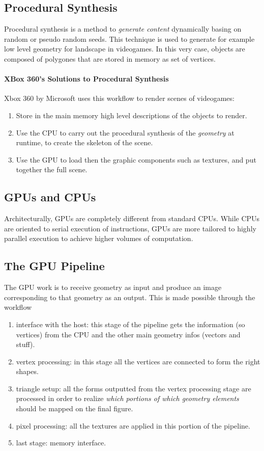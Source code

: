 \documentclass[10pt,a4paper]{article}
\begin{document}
			\subsection{Procedural Synthesis}
				Procedural synthesis is a method to \emph{generate content} dynamically basing on random or pseudo random seeds. This technique is used to generate for example low level geometry for landscape in videogames. In this very case, objects are composed of polygones that are stored in memory as set of vertices.
				
				\paragraph{XBox 360's Solutions to Procedural Synthesis}
					Xbox 360 by Microsoft uses this workflow to render scenes of videogames:
					\begin{enumerate}
						\item Store in the main memory high level descriptions of the objects to render.
						\item Use the CPU to carry out the procedural synthesis of the \emph{geometry} at runtime, to create the skeleton of the scene.
						\item Use the GPU to load then the graphic components such as textures, and put together the full scene.
					\end{enumerate}
			
			\subsection{GPUs and CPUs}
				Architecturally, GPUs are completely different from standard CPUs. While CPUs are oriented to serial execution of instructions, GPUs are more tailored to highly parallel execution to achieve higher volumes of computation.
				
			\subsection{The GPU Pipeline}
				The GPU work is to receive geometry as input and produce an image corresponding to that geometry as an output. This is made possible through the workflow
				\begin{enumerate}
					\item interface with the host: this stage of the pipeline gets the information (so vertices) from the CPU and the other main geometry infos (vectors and stuff).
					\item vertex processing: in this stage all the vertices are connected to form the right shapes. 
					\item triangle setup: all the forms outputted from the vertex processing stage are processed in order to realize \emph{which portions of which geometry elements} should be mapped on the final figure.
					\item pixel processing: all the textures are applied in this portion of the pipeline.
					\item last stage: memory interface. 
				\end{enumerate}
				
		
			
\end{document}
